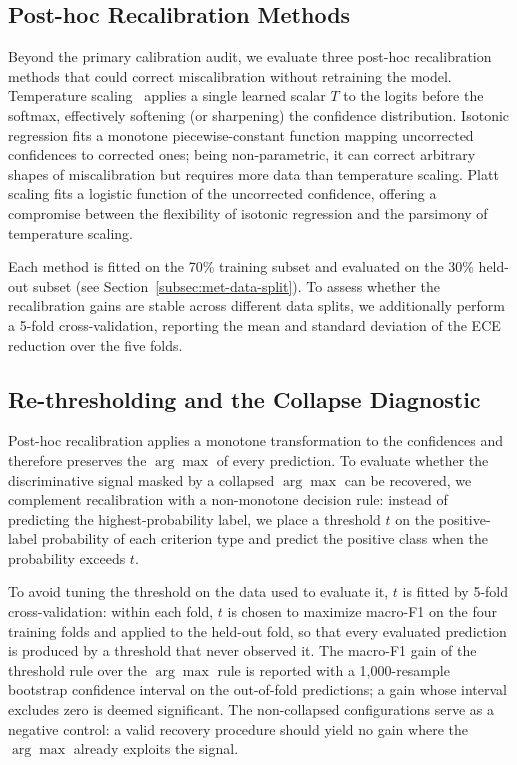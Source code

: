 \subsection{Post-hoc Recalibration Methods}
\label{subsec:met-recalibration}

Beyond the primary calibration audit, we evaluate three post-hoc 
recalibration methods that could correct miscalibration without retraining 
the model. Temperature scaling~\cite{guo2017calibration} applies a single 
learned scalar $T$ to the logits before the softmax, effectively 
softening (or sharpening) the confidence distribution. Isotonic 
regression fits a monotone piecewise-constant function mapping 
uncorrected confidences to corrected ones; being non-parametric, it can 
correct arbitrary shapes of miscalibration but requires more data than 
temperature scaling. Platt scaling fits a logistic function of the 
uncorrected confidence, offering a compromise between the flexibility of 
isotonic regression and the parsimony of temperature scaling.

Each method is fitted on the 70\% training subset and evaluated on the 
30\% held-out subset (see Section~\ref{subsec:met-data-split}). To assess 
whether the recalibration gains are stable across different data splits, 
we additionally perform a 5-fold cross-validation, reporting the mean 
and standard deviation of the ECE reduction over the five folds.

\subsection{Re-thresholding and the Collapse Diagnostic}
\label{subsec:met-rethreshold}

Post-hoc recalibration applies a monotone transformation to the 
confidences and therefore preserves the $\arg\max$ of every prediction. 
To evaluate whether the discriminative signal masked by a collapsed 
$\arg\max$ can be recovered, we complement recalibration with a 
non-monotone decision rule: instead of predicting the 
highest-probability label, we place a threshold $t$ on the 
positive-label probability of each criterion type and predict the 
positive class when the probability exceeds $t$.

To avoid tuning the threshold on the data used to evaluate it, $t$ is 
fitted by 5-fold cross-validation: within each fold, $t$ is chosen to 
maximize macro-F1 on the four training folds and applied to the held-out 
fold, so that every evaluated prediction is produced by a threshold that 
never observed it. The macro-F1 gain of the threshold rule over the 
$\arg\max$ rule is reported with a 1{,}000-resample bootstrap confidence 
interval on the out-of-fold predictions; a gain whose interval excludes 
zero is deemed significant. The non-collapsed configurations serve as a 
negative control: a valid recovery procedure should yield no gain where 
the $\arg\max$ already exploits the signal.

